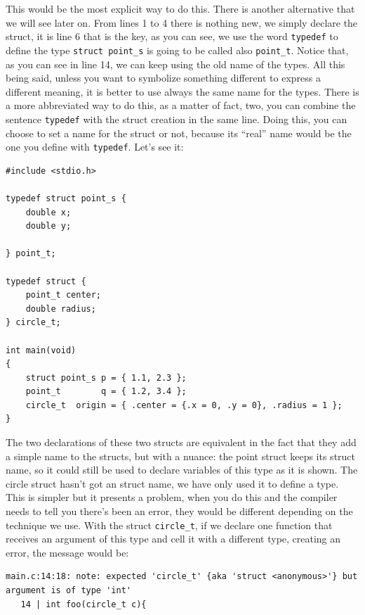 \documentclass[a4paper]{article}
\begin{document}
This would be the most explicit way to do this. There is another alternative
that we will see later on. From lines 1 to 4 there is nothing new, we simply
declare the struct, it is line 6 that is the key, as you can see, we use the
word \verb!typedef! to define the type \verb!struct point_s! is going to be
called also \verb!point_t!. Notice that, as you can see in line 14, we can keep
using the old name of the types. All this being said, unless you want to
symbolize something different to express a different meaning, it is better to
use always the same name for the types. There is a more abbreviated way to do
this, as a matter of fact, two, you can combine the sentence \verb!typedef! with
the struct creation in the same line. Doing this, you can choose to set a name
for the struct or not, because its ``real'' name would be the one you define
with \verb!typedef!. Let's see it:

\noindent
\begin{minipage}[H]{\linewidth}
\mbox{}
\begin{lstlisting}[style=C,
caption={Different combinations of \texttt{struct} with \texttt{typedef}},
label={lst:structTypeCombo}]
#include <stdio.h>

typedef struct point_s {
    double x;
    double y;

} point_t;

typedef struct {
    point_t center;
    double radius;
} circle_t;

int main(void)
{
    struct point_s p = { 1.1, 2.3 };
    point_t        q = { 1.2, 3.4 };
    circle_t  origin = { .center = {.x = 0, .y = 0}, .radius = 1 };
}
\end{lstlisting}
\end{minipage}

The two declarations of these two structs are equivalent in the fact that they
add a simple name to the structs, but with a nuance: the point struct keeps its
struct name, so it could still be used to declare variables of this type as it
is shown. The circle struct hasn't got an struct name, we have only used it
to define a type. This is simpler but it presents a problem, when you do this
and the compiler needs to tell you
there's been an error, they would be different depending on the technique we
use. With the struct \verb!circle_t!, if we declare one function that receives
an argument of this type and cell it with a different type, creating an error,
the message would be:
\begin{lstlisting}[style=terminalStyle]
main.c:14:18: note: expected 'circle_t' {aka 'struct <anonymous>'} but argument is of type 'int'
   14 | int foo(circle_t c){
\end{lstlisting}
\end{document}
